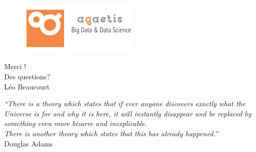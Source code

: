 \documentclass[aspectratio=169, 11pt]{beamer}
\begin{document}
\begin{frame}
  \begin{figure}
    \includegraphics[width=0.5\textwidth]{figs/AGAETIS_GREY}
  \end{figure}
  \begin{center}
    \Large
    \textcolor{agaetisOrange}{Merci !}\\
    \large
    \textcolor{agaetisOrange}{Des questions?}\\
    \normalsize
    \vspace{0.5cm}
    Léo Beaucourt
  \end{center}
\end{frame}

\begin{frame}
  \textit{“There is a theory which states that if ever anyone discovers exactly what the Universe is for and why it is here, it will instantly disappear and be replaced by something even more bizarre and inexplicable.}\\
  \vspace{1cm}
  \textit{There is another theory which states that this has already happened.”}\\
  \vspace{1cm}
  \hfill Douglas Adams
\end{frame}
\end{document}
